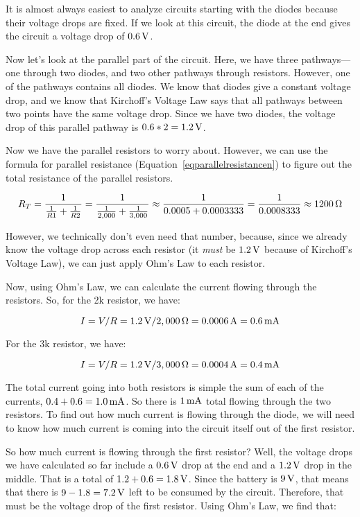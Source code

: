 It is almost always easiest to analyze circuits starting with the diodes because their voltage drops are fixed.
If we look at this circuit, the diode at the end gives the circuit a voltage drop of $0.6\,\si{\volt}$.

Now let's look at the parallel part of the circuit.
Here, we have three pathways---one through two diodes, and two other pathways through resistors.
However, one of the pathways contains all diodes.
We know that diodes give a constant voltage drop, and we know that Kirchoff's Voltage Law says that all pathways between two points have the same voltage drop.
Since we have two diodes, the voltage drop of this parallel pathway is $0.6 * 2 = 1.2\,\si{\volt}$.

Now we have the parallel resistors to worry about.
However, we can use the formula for parallel resistance (Equation~\ref{eqparallelresistancen}) to figure out the total resistance of the parallel resistors.

$$ R_T = \frac{1}{\frac{1}{R1} + \frac{1}{R2}} = \frac{1}{\frac{1}{2,000} + \frac{1}{3,000}} \approx \frac{1}{0.0005 + 0.0003333} = \frac{1}{0.0008333} \approx 1200\,\si{\ohm} $$

However, we technically don't even need that number, because, since we already know the voltage drop across each resistor (it \emph{must} be $1.2\,\si{\volt}$ because of Kirchoff's Voltage Law), we can just apply Ohm's Law to each resistor.

Now, using Ohm's Law, we can calculate the current flowing through the resistors.
So, for the 2k resistor, we have:

$$ I = V / R = 1.2\,\si{\volt} / 2,000\,\si{\ohm} = 0.0006\,\si{\ampere} = 0.6\,\si{\milli\ampere} $$

For the 3k resistor, we have:

$$ I = V / R = 1.2\,\si{\volt} / 3,000\,\si{\ohm} = 0.0004\,\si{\ampere} = 0.4\,\si{\milli\ampere} $$

The total current going into both resistors is simple the sum of each of the currents, $0.4 + 0.6 = 1.0\,\si{\milli\ampere}$.
So there is $1\,\si{\milli\ampere}$ total flowing through the two resistors.
To find out how much current is flowing through the diode, we will need to know how much current is coming into the circuit itself out of the first resistor.

So how much current is flowing through the first resistor?
Well, the voltage drops we have calculated so far include a $0.6\,\si{\volt}$ drop at the end and a $1.2\,\si{\volt}$ drop in the middle.
That is a total of $1.2 + 0.6 = 1.8\,\si{\volt}$.
Since the battery is $9\,\si{\volt}$, that means that there is $9 - 1.8 = 7.2\,\si{\volt}$ left to be consumed by the circuit.
Therefore, that must be the voltage drop of the first resistor.
Using Ohm's Law, we find that:

